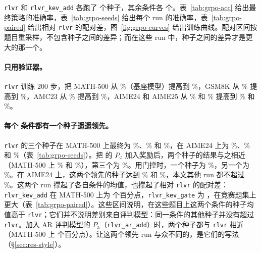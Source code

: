 \texttt{rlvr} 和 \texttt{rlvr\_kev\_add} 各跑了  个种子，其余条件各  个。表~\ref{tab:grpo-acc} 给出最终策略的准确率，表~\ref{tab:grpo-seeds} 给出每个 run 的准确率，表~\ref{tab:grpo-paired} 给出相对 \texttt{rlvr} 的配对差，图~\ref{fig:grpo-curves} 给出训练曲线。配对区间按题目重采样，不包含种子之间的差异；而在这些 run 中，种子之间的差异才是更大的那一个。

\paragraph{只用验证器。} \texttt{rlvr} 训练 200 步，把 MATH-500 从 \%（基座模型）提高到 \%，GSM8K 从 \% 提高到 \%，AMC23 从 \% 提高到 \%，AIME24 和 AIME25 从 \% 和 \% 提高到 \% 和 \%。

\begin{table}[t]
\centering\small

\caption{最终策略：准确率（\%），种子均值 $\pm$ 种子间标准差。MATH-500 和 GSM8K（1319 题）：贪心解码。AMC23、AIME24 和 AIME25：温度 0.6 下每题 16 个样本的平均。基座模型：两次评估的平均。}
\label{tab:grpo-acc}
\end{table}

\begin{table}[t]
\centering\small

\caption{每个 run 的最终策略：准确率（\%），口径同表~\ref{tab:grpo-acc}。}
\label{tab:grpo-seeds}
\end{table}

\paragraph{每个 \kev{} 条件都有一个种子遥遥领先。} \texttt{rlvr} 的三个种子在 MATH-500 上最终为 \%、\% 和 \%，在 AIME24 上为 \%、\% 和 \%（表~\ref{tab:grpo-seeds}）。把 \kev{} 的 $P_{\mathrm{c}}$ 加入奖励后，两个种子的结果与之相近（MATH-500 上 \% 和 \%），第三个为 \%。用门控时，一个种子为 \%，另一个为 \%。在 AIME24 上，这两个领先的种子达到 \% 和 \%，本文其他 run 都不超过 \%。这两个 run 撑起了各自条件的均值，也撑起了相对 \texttt{rlvr} 的配对差：\texttt{rlvr\_kev\_add} 在 MATH-500 上为   个百分点，\texttt{rlvr\_kev\_gate} 为  ，在竞赛题集上更大（表~\ref{tab:grpo-paired}）。这些区间说明，在这些题目上这两个条件的种子均值高于 \texttt{rlvr}；它们并不说明差别来自评判模型：同一条件的其他种子并没有超过 \texttt{rlvr}。加入 AR 评判模型的 $P_{\mathrm{a}}$（\texttt{rlvr\_ar\_add}）时，两个种子都与 \texttt{rlvr} 相近（MATH-500 上   个百分点）。让这两个领先 run 与众不同的，是它们的写法（\S\ref{sec:res-style}）。


